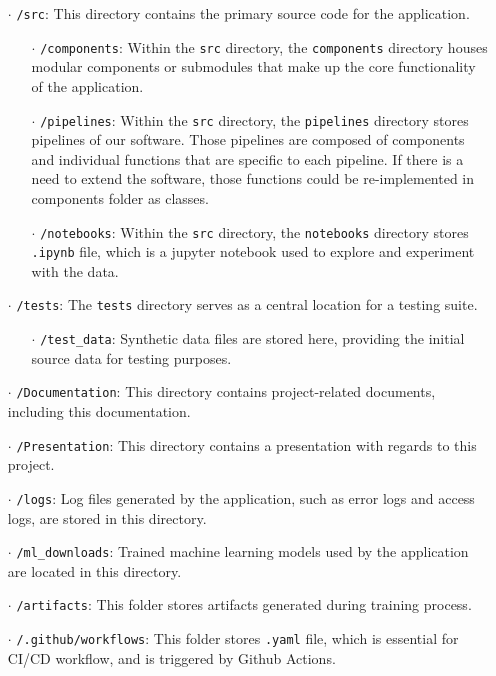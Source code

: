 \documentclass{report}
\begin{document}
\begin{itemize}
  \item[$\cdot$] \texttt{/src}: This directory contains the primary source code for the application.

  \begin{itemize}
    \item[$\cdot$] \texttt{/components}: Within the \texttt{src} directory, the \texttt{components} directory houses modular components or submodules that make up the core functionality of the application.
    \item[$\cdot$] \texttt{/pipelines}: Within the \texttt{src} directory, the \texttt{pipelines} directory stores pipelines of our software. Those pipelines are composed of components and individual functions that are specific to each pipeline. If there is a need to extend the software, those functions could be re-implemented in components folder as classes.
    \item[$\cdot$] \texttt{/notebooks}: Within the \texttt{src} directory, the \texttt{notebooks} directory stores \texttt{.ipynb} file, which is a jupyter notebook used to explore and experiment with the data.
  \end{itemize}

  \item[$\cdot$] \texttt{/tests}: The \texttt{tests} directory serves as a central location for a testing suite.
  \begin{itemize}
    \item[$\cdot$] \texttt{/test\_data}: Synthetic data files are stored here, providing the initial source data for testing purposes.
  \end{itemize}


  \item[$\cdot$] \texttt{/Documentation}: This directory contains project-related documents, including this documentation.

  \item[$\cdot$] \texttt{/Presentation}: This directory contains a presentation with regards to this project.

  \item[$\cdot$] \texttt{/logs}: Log files generated by the application, such as error logs and access logs, are stored in this directory.

  \item[$\cdot$] \texttt{/ml\_downloads}: Trained machine learning models used by the application are located in this directory.

  \item[$\cdot$] \texttt{/artifacts}: This folder stores artifacts generated during training process.

  \item[$\cdot$] \texttt{/.github/workflows}: This folder stores \texttt{.yaml} file, which is essential for CI/CD workflow, and is triggered by Github Actions.
\end{itemize}
\end{document}
